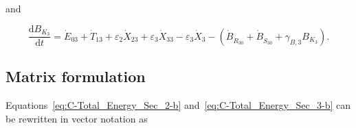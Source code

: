 \noindent{}and

\begin{equation} \label{eq:C-Total_Energy_Sec_3-b}
	\frac{\mathrm{d}B_{K_{3}}}{\mathrm{d}t}
	= \dot{E}_{03}
	+ \dot{T}_{13}
	+ \varepsilon_{2} \dot{X}_{23}
	+ \varepsilon_{3} \dot{X}_{33}
	- \varepsilon_{3} \dot{X}_{3}
	- \left( \dot{B}_{\dot{R}_{30}} 
							+ \dot{B}_{\dot{S}_{30}}
							+ \gamma_{B,3} B_{K_{3}}
							\right).
\end{equation}


\subsection{Matrix formulation} %
\label{sec:C-matrix}

Equations~\ref{eq:C-Total_Energy_Sec_2-b} 
and~\ref{eq:C-Total_Energy_Sec_3-b} can be rewritten 
in vector notation as

